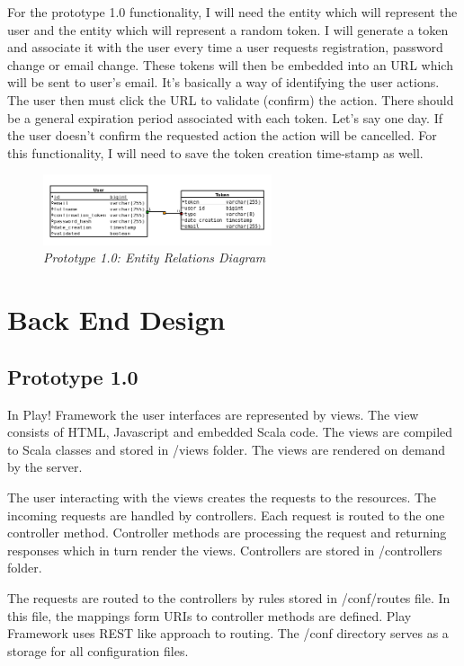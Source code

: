 \documentclass[12pt,twoside,a4paper]{report}
\begin{document}
For the prototype 1.0 functionality, I will need the entity which will represent the user and the entity which will represent a random token. I will generate a token and associate it with the user every time a user requests registration, password change or email change. These tokens will then be embedded into an URL which will be sent to user's email. It's basically a way of identifying the user actions. The user then must click the URL to validate (confirm) the action. There should be a general expiration period associated with each token. Let's say one day. If the user doesn't confirm the requested action the action will be cancelled. For this functionality, I will need to save the token creation time-stamp as well.

\begin{figure}[!ht]
	\centering
		\includegraphics[width=0.6\textwidth, totalheight=4.5cm]
		{entity_relations_diagram1}
	\caption{\textit{Prototype 1.0: Entity Relations Diagram}}
	\label{f3.8.1}
\end{figure}

\section{Back End Design}\label{3.9}

\subsection{Prototype 1.0}\label{3.9.1}
In Play! Framework the user interfaces are represented by views. The view consists of HTML, Javascript and embedded Scala\cite{30} code. The views are compiled to Scala classes and stored in /views folder. The views are rendered on demand by the server.

The user interacting with the views creates the requests to the resources. The incoming requests are handled by controllers. Each request is routed to the one controller method. Controller methods are processing the request and returning responses which in turn render the views. Controllers are stored in /controllers folder.

The requests are routed to the controllers by rules stored in /conf/routes file. In this file, the mappings form URIs to controller methods are defined. Play Framework uses REST like approach to routing. The /conf directory serves as a storage for all configuration files.
\end{document}
